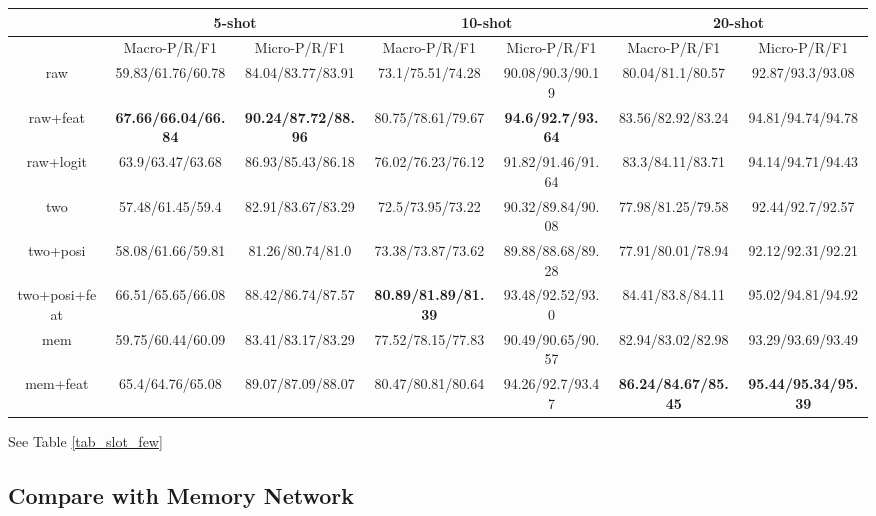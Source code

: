 \begin{table*}
\setlength{\tabcolsep}{0.23em}
\centering
\small{
\begin{tabular}{|c|c|c|c|c|c|c|}

\hline
  & \multicolumn{2}{|c|}{5-shot} & \multicolumn{2}{|c|}{10-shot} & \multicolumn{2}{|c|}{20-shot}  \\
 \hline
  & Macro-P/R/F1 & Micro-P/R/F1 & Macro-P/R/F1 & Micro-P/R/F1  & Macro-P/R/F1 & Micro-P/R/F1   \\
\hline
raw & 59.83/61.76/60.78 & 84.04/83.77/83.91 & 73.1/75.51/74.28  & 90.08/90.3/90.19 & 80.04/81.1/80.57 & 92.87/93.3/93.08 \\
\hline
raw+feat & \textbf{67.66/66.04/66.84} & \textbf{90.24/87.72/88.96} & 80.75/78.61/79.67 & \textbf{94.6/92.7/93.64} & 83.56/82.92/83.24 & 94.81/94.74/94.78 \\
\hline
raw+logit & 63.9/63.47/63.68 & 86.93/85.43/86.18 & 76.02/76.23/76.12 & 91.82/91.46/91.64  & 83.3/84.11/83.71 & 94.14/94.71/94.43 \\
\hline
two & 57.48/61.45/59.4 & 82.91/83.67/83.29 & 72.5/73.95/73.22 & 90.32/89.84/90.08 & 77.98/81.25/79.58 & 92.44/92.7/92.57 \\
\hline
two+posi & 58.08/61.66/59.81 & 81.26/80.74/81.0 & 73.38/73.87/73.62 & 89.88/88.68/89.28 & 77.91/80.01/78.94 & 92.12/92.31/92.21 \\
\hline
two+posi+feat & 66.51/65.65/66.08 & 88.42/86.74/87.57 & \textbf{80.89/81.89/81.39} & 93.48/92.52/93.0 & 84.41/83.8/84.11 & 95.02/94.81/94.92\\
\hline
mem & 59.75/60.44/60.09 & 83.41/83.17/83.29 & 77.52/78.15/77.83  & 90.49/90.65/90.57 & 82.94/83.02/82.98 & 93.29/93.69/93.49 \\
\hline
mem+feat & 65.4/64.76/65.08 & 89.07/87.09/88.07 & 80.47/80.81/80.64 & 94.26/92.7/93.47 & \textbf{86.24/84.67/85.45} & \textbf{95.44/95.34/95.39} \\
\hline

\end{tabular}
}
\caption{Intent Detection Result on Few-Shot Data}
\label{tab_slot_few}
\end{table*}
See Table \ref{tab_slot_few}


\subsection{Compare with Memory Network}

